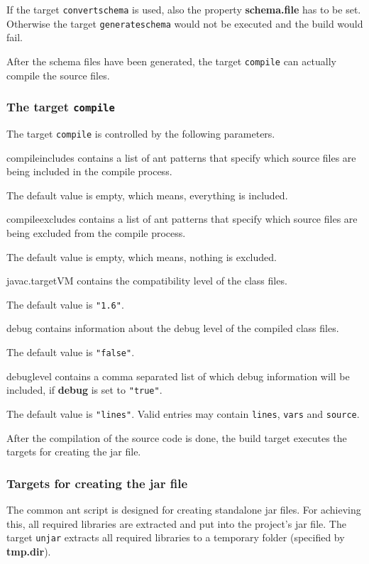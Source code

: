 \documentclass[a4paper,twoside,11pt,bibtotoc]{article}
\begin{document}
If the target \texttt{convertschema} is used, also the property \textbf{schema.file} has to be set.
Otherwise the target \texttt{generateschema} would not be executed and the build would fail.

After the schema files have been generated, the target \texttt{compile} can actually compile the source files.
\subsubsection{The target \texttt{compile}}
\label{sec:compile}
The target \texttt{compile} is controlled by the following parameters.

\begin{description*}
	\item[compileincludes] contains a list of ant patterns that specify which source files are being included in the compile process.\par The default value is empty, which means, everything is included.
	\item[compileexcludes] contains a list of ant patterns that specify which source files are being excluded from the compile process.\par The default value is empty, which means, nothing is excluded.
	\item[javac.targetVM] contains the compatibility level of the class files.\par The default value is \texttt{"1.6"}.
	\item[debug] contains information about the debug level of the compiled class files.\par The default value is \texttt{"false"}.
	\item[debuglevel] contains a comma separated list of which debug information will be included, if \textbf{debug} is set to \texttt{"true"}.\par The default value is \texttt{"lines"}. Valid entries may contain \texttt{lines}, \texttt{vars} and \texttt{source}.
\end{description*}

After the compilation of the source code is done, the build target executes the targets for creating the jar file.

\subsubsection{Targets for creating the jar file}
The common ant script is designed for creating standalone jar files.
For achieving this, all required libraries are extracted and put into the project's jar file.
The target \texttt{unjar} extracts all required libraries to a temporary folder (specified by \textbf{tmp.dir}).
\end{document}
